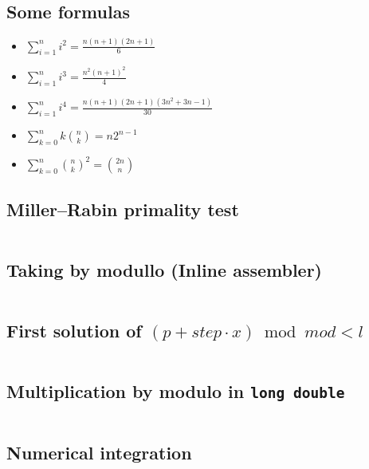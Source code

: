 \documentclass{article}
\begin{document}
\subsection{Some formulas}
\begin{itemize}
\item $\sum\limits_{i = 1}^{n} i^2 = \frac{n(n + 1)(2n + 1)}{6}$
\item $\sum\limits_{i = 1}^{n} i^3 = \frac{n^2(n + 1)^2}{4}$
\item $\sum\limits_{i = 1}^{n} i^4 = \frac{n(n + 1)(2n + 1)(3n^2 + 3n - 1)}{30}$
\item $\sum\limits_{k = 0}^{n} k \binom{n}{k} = n 2^{n - 1}$
\item $\sum\limits_{k = 0}^{n} \binom{n}{k}^2 = \binom{2n}{n}$
\end{itemize}
\subsection{Miller–Rabin primality test}
\inputminted[mathescape, breaklines, breakafter=(, tabsize=2, frame=lines, showtabs, tab=|\ , tabcolor=lightgray]{c++}{./numeric/miller-rabin/miller-rabin.cpp}
\subsection{Taking by modullo (Inline assembler)}
\inputminted[mathescape, breaklines, breakafter=(, tabsize=2, frame=lines, showtabs, tab=|\ , tabcolor=lightgray]{c++}{./numeric/mod-asm/mod-asm.cpp}
\subsection{First solution of $(p + step \cdot x) \bmod mod < l$}
\inputminted[mathescape, breaklines, breakafter=(, tabsize=2, frame=lines, showtabs, tab=|\ , tabcolor=lightgray]{c++}{./numeric/mod-ineq-first-sol/mod-ineq-first-sol.cpp}
\subsection{Multiplication by modulo in \texttt{long double}}
\inputminted[mathescape, breaklines, breakafter=(, tabsize=2, frame=lines, showtabs, tab=|\ , tabcolor=lightgray]{c++}{./numeric/mult-by-mod/mult-by-mod.cpp}
\subsection{Numerical integration}
\inputminted[mathescape, breaklines, breakafter=(, tabsize=2, frame=lines, showtabs, tab=|\ , tabcolor=lightgray]{c++}{./numeric/numerical-integration/numerical-integration.cpp}
\end{document}
